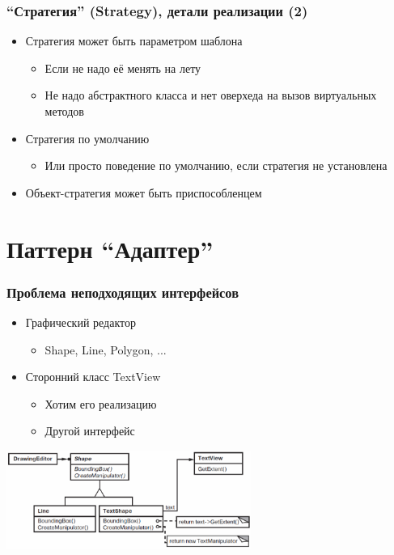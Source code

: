 \documentclass{../../slides-style}
\begin{document}
    \begin{frame}
        \frametitle{``Стратегия'' (Strategy), детали реализации (2)}
        \begin{itemize}
            \item Стратегия может быть параметром шаблона
            \begin{itemize}
                \item Если не надо её менять на лету
                \item Не надо абстрактного класса и нет оверхеда на вызов виртуальных методов
            \end{itemize}
            \item Стратегия по умолчанию
            \begin{itemize}
                \item Или просто поведение по умолчанию, если стратегия не установлена
            \end{itemize}
            \item Объект-стратегия может быть приспособленцем
        \end{itemize}
    \end{frame}

    \section{Паттерн ``Адаптер''}

    \begin{frame}
        \frametitle{Проблема неподходящих интерфейсов}
        \begin{itemize}
            \item Графический редактор
            \begin{itemize}
                \item Shape, Line, Polygon, ...
            \end{itemize}
            \item Сторонний класс TextView
            \begin{itemize}
                \item Хотим его реализацию
                \item Другой интерфейс
            \end{itemize}
        \end{itemize}
        \vspace{2mm}
        \begin{center}
            \includegraphics[width=0.6\textwidth]{adapterExample.png}
        \end{center}
    \end{frame}
\end{document}
